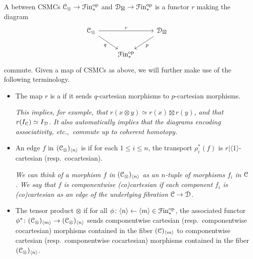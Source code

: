 \documentclass[main.tex]{subfiles}
\begin{document}
\begin{definition}
  \label{def:terminology_about_csmcs}
  A  between CSMCs $\mathcal{C}_{\otimes} \to \mathcal{F}\mathrm{in}_{*}^{\mathrm{op}}$ and $\mathcal{D}_{\boxtimes} \to \mathcal{F}\mathrm{in}_{*}^{\mathrm{op}}$ is a functor $r$ making the diagram
  \begin{equation*}
    \begin{tikzcd}
      \category{C}_{\otimes}
      \arrow[rr, "r"]
      \arrow[dr, swap, "q"]
      && \category{D}_{\boxtimes}
      \arrow[dl, "p"]
      \\
      & \Finp\op
    \end{tikzcd}
  \end{equation*}
  commute. Given a map of CSMCs as above, we will further make use of the following terminology.
  \begin{itemize}
    \item The map $r$ is a  if it sends $q$-cartesian morphisms to $p$-cartesian morphisms.

      \textit{This implies, for example, that $r(x \otimes y) \simeq r(x) \boxtimes r(y)$, and that $r(I_{\mathcal{C}}) \simeq I_{\mathcal{D}}$. It also automatically implies that the diagrams encoding associativity, etc.,\ commute up to coherent homotopy.}

    \item An edge $f$ in $(\mathcal{C}_{\otimes})_{\langle n \rangle}$ is  if for each $1 \leq i \leq n$, the transport $\rho_{i}^{*}(f)$ is $r|\langle 1 \rangle$-cartesian (resp.\ cocartesian).

      \textit{We can think of a morphism $f$ in $(\mathcal{C}_{\otimes})_{\langle n \rangle}$ as an $n$-tuple of morphisms $f_{i}$ in $\mathcal{C}$. We say that $f$ is componentwise (co)cartesian if each component $f_{i}$ is (co)cartesian as an edge of the underlying fibration $\mathcal{C} \to \mathcal{D}$.}

    \item The tensor product $\otimes$  if for all $\phi\colon \langle n \rangle \leftarrow \langle m \rangle \in \mathcal{F}\mathrm{in}_{*}^{\mathrm{op}}$, the associated functor $\phi^{*}\colon (\mathcal{C}_{\otimes})_{\langle m \rangle} \to (\mathcal{C}_{\otimes})_{\langle n \rangle}$ sends componentwise cartesian (resp.\ componentwise cocartesian) morphisms contained in the fiber $(\mathcal{C})_{\langle m \rangle}$ to componentwise cartesian (resp.\ componentwise cocartesian) morphisms contained in the fiber $(\mathcal{C}_{\otimes})_{\langle n \rangle}$.


\end{itemize}
\end{definition}
\end{document}
